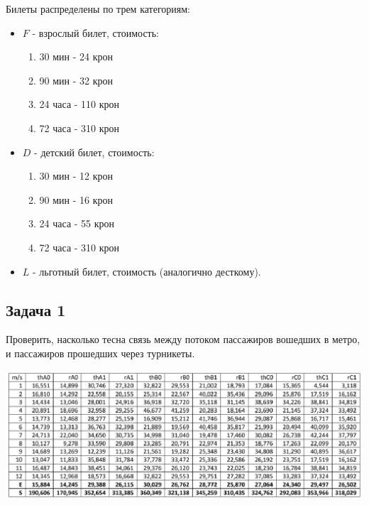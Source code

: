 \documentclass[a4paper, 12pt]{article}   	%
\begin{document}
    Билеты распределены по трем категориям:
    \begin{itemize}
        \item $F$ - взрослый билет, стоимость:
        \begin{enumerate}
            \item 30 мин - 24 крон
            \item 90 мин - 32 крон
            \item 24 часа - 110 крон
            \item 72 часа - 310 крон
        \end{enumerate}
        \item $D$ - детский билет, стоимость:
        \begin{enumerate}
            \item 30 мин - 12 крон
            \item 90 мин - 16 крон
            \item 24 часа - 55 крон
            \item 72 часа - 310 крон
        \end{enumerate}
        \item $L$ - льготный билет, стоимость (аналогично десткому).
    \end{itemize}
    
\subsection{Задача 1}
    Проверить, насколько тесна связь между потоком пассажиров вошедших в метро, и пассажиров прошедших через турникеты.
    
    \begin{center}
        \begin{minipage}{0.9\linewidth}
            \includegraphics[width=\linewidth]{img/task_1}
        \end{minipage}
    \end{center}
    
\end{document}
